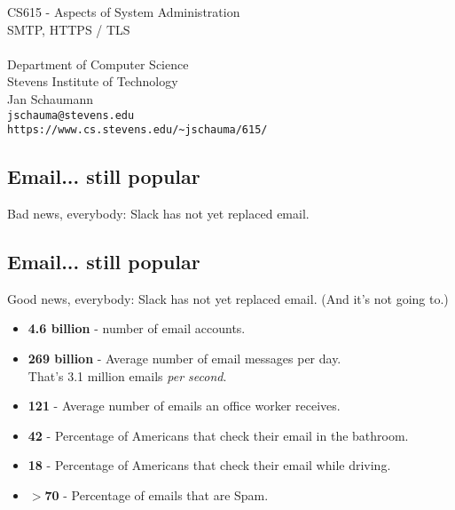 \documentclass[xga]{xdvislides}
\begin{document}
\setfontphv

\lhead{\slidetitle}                               %
\cfoot{\relax}                               %
\rfoot{\Gray{\today}}

\newcommand{\smallish}{\fontsize{16}{16}\selectfont}

\vspace*{\fill}
\begin{center}
	\Hugesize
		CS615 - Aspects of System Administration\\ [1em]
		SMTP, HTTPS / TLS\\ [1em]
	\hspace*{5mm}\blueline\\ [1em]
	\Normalsize
		Department of Computer Science\\
		Stevens Institute of Technology\\
		Jan Schaumann\\
		\verb+jschauma@stevens.edu+\\
		\verb+https://www.cs.stevens.edu/~jschauma/615/+
\end{center}
\vspace*{\fill}

\subsection{Email... still popular}
Bad news, everybody: Slack has not yet replaced email.

\subsection{Email... still popular}
Good news, everybody: Slack has not yet replaced email. (And it's not going to.)
\\

\begin{itemize}
	\item {\bf 4.6 billion} - number of email accounts.
	\item {\bf 269 billion} - Average number of email messages per day. \\
		That's 3.1 million emails {\em per second}.
	\item {\bf 121} - Average number of emails an office worker receives.
	\item {\bf 42} - Percentage of Americans that check their email in the bathroom.
	\item {\bf 18} - Percentage of Americans that check their email while driving.
	\item {\bf $>$70} - Percentage of emails that are Spam.
\end{itemize}
\end{document}
